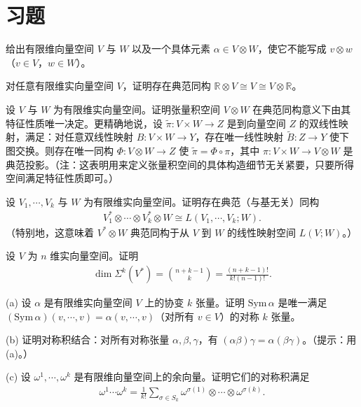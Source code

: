 \documentclass[../../main.tex]{subfiles}
\begin{document}
\section*{习题}\label{section:ch12-习题}

\begin{exercise}\label{exercise:ch12-01}
给出有限维向量空间 $V$ 与 $W$ 以及一个具体元素 $\alpha\in V\otimes W$，使它不能写成 $v\otimes w$（$v\in V$，$w\in W$）。
\end{exercise}

\begin{exercise}\label{exercise:ch12-02}
对任意有限维实向量空间 $V$，证明存在典范同构 $\mathbb{R}\otimes V\cong V\cong V\otimes\mathbb{R}$。
\end{exercise}

\begin{exercise}\label{exercise:ch12-03}
设 $V$ 与 $W$ 为有限维实向量空间。证明张量积空间 $V\otimes W$ 在典范同构意义下由其特征性质唯一决定。更精确地说，设 $\widetilde\pi\colon V\times W\to Z$ 是到向量空间 $Z$ 的双线性映射，满足：对任意双线性映射 $B\colon V\times W\to Y$，存在唯一线性映射 $\widetilde B\colon Z\to Y$ 使下图交换。则存在唯一同构 $\Phi\colon V\otimes W\to Z$ 使 $\widetilde\pi=\Phi\circ\pi$，其中 $\pi\colon V\times W\to V\otimes W$ 是典范投影。（注：这表明用来定义张量积空间的具体构造细节无关紧要，只要所得空间满足特征性质即可。）
\end{exercise}

\begin{exercise}\label{exercise:ch12-04}
设 $V_1,\cdots ,V_k$ 与 $W$ 为有限维实向量空间。证明存在典范（与基无关）同构
\begin{align*}
V_1^*\otimes\cdots\otimes V_k^*\otimes W\cong L(V_1,\cdots ,V_k;W).
\end{align*}
（特别地，这意味着 $V^*\otimes W$ 典范同构于从 $V$ 到 $W$ 的线性映射空间 $L(V;W)$。）
\end{exercise}

\begin{exercise}\label{exercise:ch12-05}
设 $V$ 为 $n$ 维实向量空间。证明
\begin{align*}
\dim\Sigma^k(V^*)=\binom{n+k-1}{k}=\frac{(n+k-1)!}{k!(n-1)!}.
\end{align*}
\end{exercise}

\begin{exercise}\label{exercise:ch12-06}
(a) 设 $\alpha$ 是有限维实向量空间 $V$ 上的协变 $k$ 张量。证明 $\mathrm{Sym}\,\alpha$ 是唯一满足 $(\mathrm{Sym}\,\alpha)(v,\cdots ,v)=\alpha(v,\cdots ,v)$（对所有 $v\in V$）的对称 $k$ 张量。

(b) 证明对称积结合：对所有对称张量 $\alpha,\beta,\gamma$，有 $(\alpha\beta)\gamma=\alpha(\beta\gamma)$。（提示：用 (a)。）

(c) 设 $\omega^1,\cdots ,\omega^k$ 是有限维向量空间上的余向量。证明它们的对称积满足
\begin{align*}
\omega^1\cdots\omega^k=\frac{1}{k!}\sum_{\sigma\in S_k}\omega^{\sigma(1)}\otimes\cdots\otimes\omega^{\sigma(k)}.
\end{align*}
\end{exercise}
\end{document}
